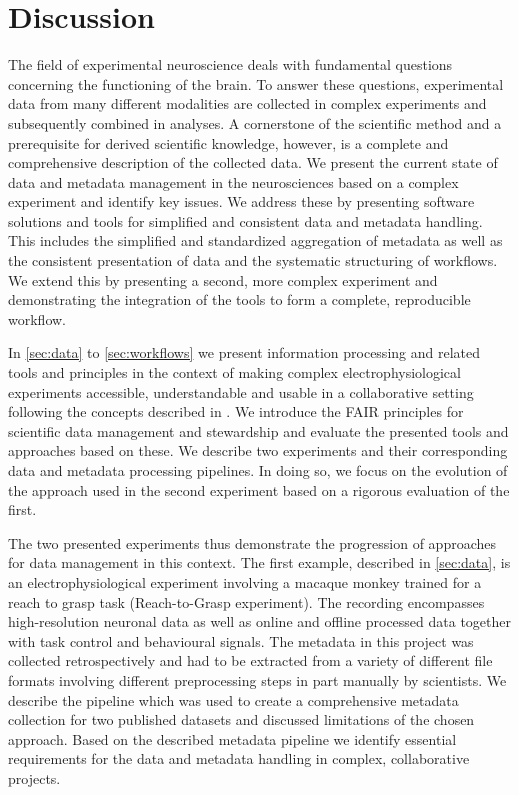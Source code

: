 \clearpage
\chapter{Discussion}
\label{sec:discussion}

The field of experimental neuroscience deals with fundamental questions concerning the functioning of the brain. To answer these questions, experimental data from many different modalities are collected in complex experiments and subsequently combined in analyses. A cornerstone of the scientific method and a prerequisite for derived scientific knowledge, however, is a complete and comprehensive description of the collected data. We present the current state of data and metadata management in the neurosciences based on a complex experiment and identify key issues. We address these by presenting software solutions and tools for simplified and consistent data and metadata handling. This includes the simplified and standardized aggregation of metadata as well as the consistent presentation of data and the systematic structuring of workflows. We extend this by presenting a second, more complex experiment and demonstrating the integration of the tools to form a complete, reproducible workflow.

In \cref{sec:data} to \cref{sec:workflows} we present information processing and related tools and principles in the context of making complex electrophysiological experiments accessible, understandable and usable in a collaborative setting following the concepts described in \citet{Zehl_2016, Zehl_2018}. We introduce the FAIR principles for scientific data management and stewardship and evaluate the presented tools and approaches based on these. We describe two experiments and their corresponding data and metadata processing pipelines. In doing so, we focus on the evolution of the approach used in the second experiment based on a rigorous evaluation of the first.

The two presented experiments thus demonstrate the progression of approaches for data management in this context. The first example, described in \cref{sec:data}, is an electrophysiological experiment involving a macaque monkey trained for a reach to grasp task (Reach-to-Grasp experiment). The recording encompasses high-resolution neuronal data as well as online and offline processed data together with task control and behavioural signals. The metadata in this project was collected retrospectively and had to be extracted from a variety of different file formats involving different preprocessing steps in part manually by scientists. We describe the pipeline which was used to create a comprehensive metadata collection for two published datasets and discussed limitations of the chosen approach. Based on the described metadata pipeline we identify essential requirements for the data and metadata handling in complex, collaborative projects.

